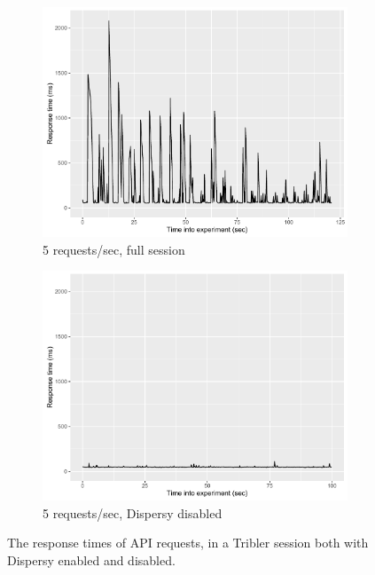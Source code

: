 \begin{figure}[h!]
	\centering
	\begin{subfigure}{.5\textwidth}
		\centering
		\includegraphics[width=1.0\linewidth]{images/experiments/api_performance_200ms}
		\caption{5 requests/sec, full session}
		\label{fig:api-performance-200ms}
	\end{subfigure}%
	\begin{subfigure}{.5\textwidth}
		\centering
		\includegraphics[width=1.0\linewidth]{images/experiments/api_performance_200ms_nodispersy}
		\caption{5 requests/sec, Dispersy disabled}
		\label{fig:api-performance-200ms-nodispersy}
	\end{subfigure}
	\caption{The response times of API requests, in a Tribler session both with Dispersy enabled and disabled.}
	\label{fig:api-performance}
\end{figure}


